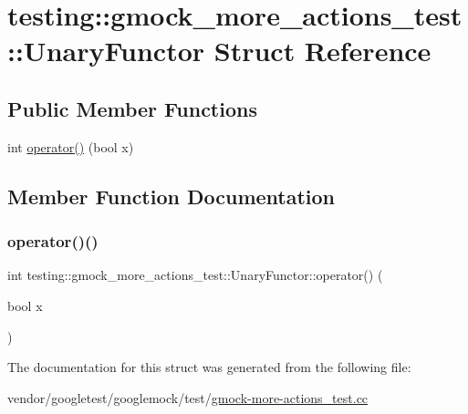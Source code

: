 \hypertarget{structtesting_1_1gmock__more__actions__test_1_1_unary_functor}{}\section{testing\+:\+:gmock\+\_\+more\+\_\+actions\+\_\+test\+:\+:Unary\+Functor Struct Reference}
\label{structtesting_1_1gmock__more__actions__test_1_1_unary_functor}
\subsection*{Public Member Functions}
\begin{DoxyCompactItemize}
\item 
int \hyperlink{structtesting_1_1gmock__more__actions__test_1_1_unary_functor_a3c33592b266e8ed2c7980df9868db53a}{operator()} (bool x)
\end{DoxyCompactItemize}


\subsection{Member Function Documentation}
\mbox{\label{structtesting_1_1gmock__more__actions__test_1_1_unary_functor_a3c33592b266e8ed2c7980df9868db53a}} 
\subsubsection{\texorpdfstring{operator()()}{operator()()}}
{\footnotesize\ttfamily int testing\+::gmock\+\_\+more\+\_\+actions\+\_\+test\+::\+Unary\+Functor\+::operator() (\begin{DoxyParamCaption}\item[{bool}]{x }\end{DoxyParamCaption})\hspace{0.3cm}{\ttfamily [inline]}}



The documentation for this struct was generated from the following file\+:\begin{DoxyCompactItemize}
\item 
vendor/googletest/googlemock/test/\hyperlink{gmock-more-actions__test_8cc}{gmock-\/more-\/actions\+\_\+test.\+cc}\end{DoxyCompactItemize}
